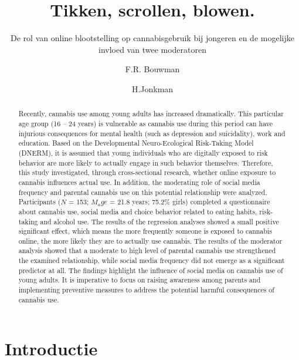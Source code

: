 \documentclass[
  letterpaper,
  DIV=11,
  numbers=noendperiod]{scrartcl}
\title{Tikken, scrollen, blowen.}
\subtitle{De rol van online blootstelling op cannabisgebruik bij
jongeren en de mogelijke invloed van twee moderatoren}
\author{F.R. Bouwman \and H.Jonkman}
\date{}
\renewcommand*\contentsname{Table of contents}
\newcommand\contentsname{Table of contents}
\begin{document}
\maketitle
\begin{abstract}
Recently, cannabis use among young adults has increased dramatically.
This particular age group (16 -- 24 years) is vulnerable as cannabis use
during this period can have injurious consequences for mental health
(such as depression and suicidality), work and education. Based on the
Developmental Neuro-Ecological Risk-Taking Model (DNERM), it is assumed
that young individuals who are digitally exposed to risk behavior are
more likely to actually engage in such behavior themselves. Therefore,
this study investigated, through cross-sectional research, whether
online exposure to cannabis influences actual use. In addition, the
moderating role of social media frequency and parental cannabis use on
this potential relationship were analyzed. Participants (\(N\) = 153;
\(M_age\) = 21.8 years; 75.2\% girls) completed a questionnaire about
cannabis use, social media and choice behavior related to eating habits,
risk-taking and alcohol use. The results of the regression analyses
showed a small positive significant effect, which means the more
frequently someone is exposed to cannabis online, the more likely they
are to actually use cannabis. The results of the moderator analysis
showed that a moderate to high level of parental cannabis use
strengthened the examined relationship, while social media frequency did
not emerge as a significant predictor at all. The findings highlight the
influence of social media on cannabis use of young adults. It is
imperative to focus on raising awareness among parents and implementing
preventive measures to address the potential harmful consequences of
cannabis use.
\end{abstract}
\ifdefined\Shaded\renewenvironment{Shaded}{\begin{tcolorbox}[boxrule=0pt, borderline west={3pt}{0pt}{shadecolor}, interior hidden, enhanced, breakable, sharp corners, frame hidden]}{\end{tcolorbox}}\fi

\renewcommand*\contentsname{Table of contents}
{
\hypersetup{linkcolor=}
\setcounter{tocdepth}{3}
\tableofcontents
}
\hypertarget{introductie}{%
\section{Introductie}\label{introductie}}
\end{document}
